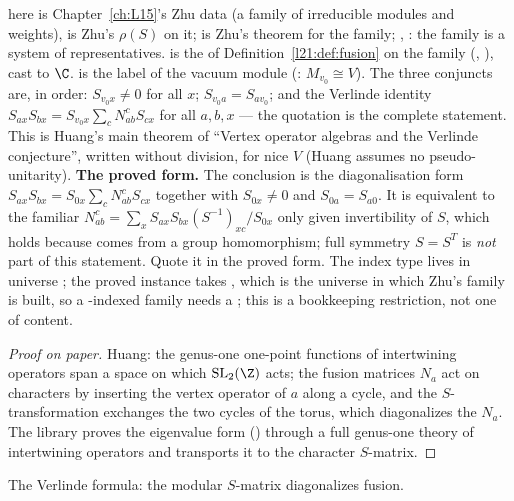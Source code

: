 \begin{dictionary}
 here is Chapter~\ref{ch:L15}'s Zhu data (a family  of irreducible modules and
weights),  is Zhu's $\rho(S)$ on it;  is Zhu's theorem for the family;
, : the family is a system of representatives.  is the
 of Definition~\ref{l21:def:fusion} on the family (, ), cast to $\C$.  is the label of the
vacuum module (: $M_{v_0}\cong V$). The three conjuncts are, in order:
$S_{v_0x}\ne0$ for all $x$; $S_{v_0a}=S_{av_0}$; and the Verlinde identity
$S_{ax}S_{bx}=S_{v_0x}\sum_cN_{ab}^cS_{cx}$ for all $a,b,x$ --- the quotation is the complete statement. This is Huang's
main theorem of ``Vertex operator algebras and the Verlinde conjecture'', written without division, for nice $V$
(Huang assumes no pseudo-unitarity). \textbf{The proved form.} The conclusion is the diagonalisation form
$S_{ax}S_{bx}=S_{0x}\sum_cN_{ab}^cS_{cx}$ together with $S_{0x}\ne0$ and $S_{0a}=S_{a0}$. It is equivalent to the
familiar $N_{ab}^c=\sum_xS_{ax}S_{bx}(S^{-1})_{xc}/S_{0x}$ only given invertibility of $S$, which holds because
 comes from a group homomorphism; full symmetry $S=S^{T}$ is \emph{not} part of this statement. Quote it in the
proved form. The index type
 lives in universe ; the proved instance takes , which is the universe in which Zhu's
family is built, so a -indexed family needs a ; this is a bookkeeping restriction, not one of
content.
\end{dictionary}

\begin{proof}[Proof on paper]
Huang: the genus-one one-point functions of intertwining operators span a space on which $\ltwooneSL(\Z)$ acts; the
fusion matrices $N_a$ act on characters by inserting the vertex operator of $a$ along a cycle, and the $S$-transformation
exchanges the two cycles of the torus, which diagonalizes the $N_a$. The library proves the eigenvalue form
() through a full genus-one theory of intertwining operators and transports it to the
character $S$-matrix.
\end{proof}

\begin{physics}
The Verlinde formula: the modular $S$-matrix diagonalizes fusion.
\end{physics}

